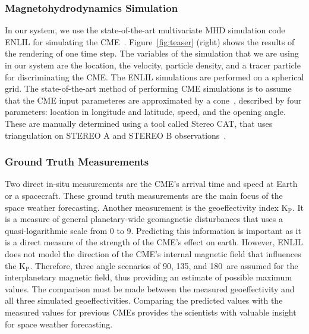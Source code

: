 \documentclass[journal]{vgtc}                %
\newcommand{\kpIndex}{$\textrm{K}_\textrm{P}$}
\begin{document}
\subsubsection{Magnetohydrodynamics Simulation} \label{sec:mhd}
In our system, we use the state-of-the-art multivariate MHD simulation code ENLIL for simulating the CME~\cite{odstrcil2002merging}. Figure~\ref{fig:teaser} (right) shows the results of the rendering of one time step. The variables of the simulation that we are using in our system are the location, the velocity, particle density, and a tracer particle for discriminating the CME. The ENLIL simulations are performed on a spherical grid. The state-of-the-art method of performing CME simulations is to assume that the CME input parameteres are approximated by a cone~\cite{Arge:2000jz}, described by four parameters: location in longitude and latitude, speed, and the opening angle. These are manually determined using a tool called Stereo CAT, that uses triangulation on STEREO A and STEREO B observations~\cite{Millward:2013cm}.%


\subsubsection{Ground Truth Measurements} \label{sec:insitu}
Two direct in-situ measurements are the CME's arrival time and speed at Earth or a spacecraft. These ground truth measurements are the main focus of the space weather forecasting. Another measurement is the geoeffectivity index \kpIndex. It is a measure of general planetary-wide geomagnetic disturbances that uses a quasi-logarithmic scale from 0 to 9. Predicting this information is important as it is a direct measure of the strength of the CME's effect on earth. However, ENLIL does not model the direction of the CME's internal magnetic field that influences the \kpIndex . Therefore, three angle scenarios of 90\degree , 135\degree , and 180\degree\ are assumed for the interplanetary magnetic field, thus providing an estimate of possible maximum values. The comparison must be made between the measured geoeffectivity and all three simulated geoeffectivities. Comparing the predicted values with the measured values for previous CMEs provides the scientists with valuable insight for space weather forecasting.
\end{document}
